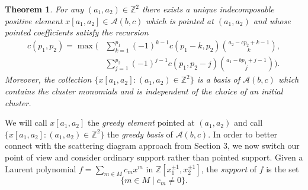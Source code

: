 \documentclass[11pt]{amsart}
\newtheorem{theorem}{Theorem}[section]
\theoremstyle{remark}
\numberwithin{equation}{section}
\newcommand{\ZZ}{\mathbb{Z}}
\newcommand{\cA}{\mathcal{A}}
\begin{document}
\begin{theorem}\label{th:greedy}\cite[Theorem~1.7]{LLZ}
  For any $(a_1,a_2)\in\ZZ^2$ there exists a unique indecomposable positive
  element $x[a_1,a_2]\in\cA(b,c)$ which is pointed at $(a_1,a_2)$ and whose
  pointed coefficients satisfy the recursion
  \begin{align}
    \label{eq:greedy recursion}
    c(p_1,p_2)=\max\bigg(
    &\sum\limits_{k=1}^{p_1} (-1)^{k-1}c(p_1-k,p_2){a_2-cp_2+k-1\choose k},\\
    \nonumber&\sum\limits_{ j =1}^{p_2} (-1)^{ j -1}c(p_1,p_2- j ){a_1-bp_1+ j -1\choose  j }\bigg).
  \end{align}
  Moreover, the collection $\{x[a_1,a_2]:(a_1,a_2)\in\ZZ^2\}$ is a basis of
  $\cA(b,c)$ which contains the cluster monomials and is independent of the
  choice of an initial cluster.
\end{theorem}
We will call $x[a_1,a_2]$ the \emph{greedy element} pointed at $(a_1,a_2)$ and
call $\{x[a_1,a_2]:(a_1,a_2)\in\ZZ^2\}$ the \emph{greedy basis} of $\cA(b,c)$.  In order to better connect with the scattering diagram approach from Section 3, we now switch our point of view and consider ordinary support rather than pointed support.  Given a Laurent polynomial $f=\sum_{m\in M}c_mx^m$ in $\ZZ[x_1^{\pm1},x_2^{\pm1}]$, the \emph{support} of $f$ is the set
\[ \{m\in M \mid c_m\neq 0\}. \]
\end{document}
